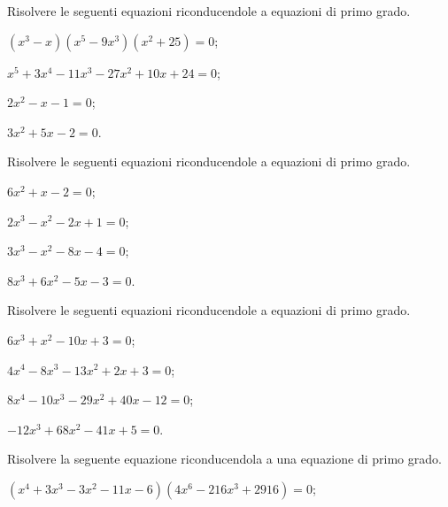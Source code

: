 \begin{esercizio}[\Ast]
\label{ese:17.11}
Risolvere le seguenti equazioni riconducendole a equazioni di primo grado.
\begin{multicols}{2}
\begin{enumeratea}
 \item $(x^{3}-x)(x^{5}-9x^{3})(x^{2}+25)=0$;
 \item $x^{5}+3x^{4}-11x^{3}-27x^{2}+10x+24=0$;
 \item $2x^{2}-x-1=0$;
 \item $3x^{2}+5x-2=0$.
\end{enumeratea}
\end{multicols}
\end{esercizio}

\begin{esercizio}[\Ast]
\label{ese:17.12}
Risolvere le seguenti equazioni riconducendole a equazioni di primo grado.
\begin{multicols}{2}
\begin{enumeratea}
 \item $6x^{2}+x-2=0$;
 \item $2x^{3}-x^{2}-2x+1=0$;
 \item $3x^{3}-x^{2}-8x-4=0$;
 \item $8x^{3}+6x^{2}-5x-3=0$.
\end{enumeratea}
\end{multicols}
\end{esercizio}

\begin{esercizio}[\Ast]
\label{ese:17.13}
Risolvere le seguenti equazioni riconducendole a equazioni di primo grado.
\begin{multicols}{2}
\begin{enumeratea}
 \item $6x^{3}+x^{2}-10x+3=0$;
 \item $4x^{4}-8x^{3}-13x^{2}+2x+3=0$;
 \item $8x^{4}-10x^{3}-29x^{2}+40x-12=0$;
 \item $-12x^{3}+68x^{2}-41x+5=0$.
\end{enumeratea}
\end{multicols}
\end{esercizio}

\begin{esercizio}[\Ast]
\label{ese:17.14}
Risolvere la seguente equazione riconducendola a una equazione di primo grado.

$(x^{4}+3x^{3}-3x^{2}-11x-6)(4x^{6}-216x^{3}+2916)=0$;
\end{esercizio}

